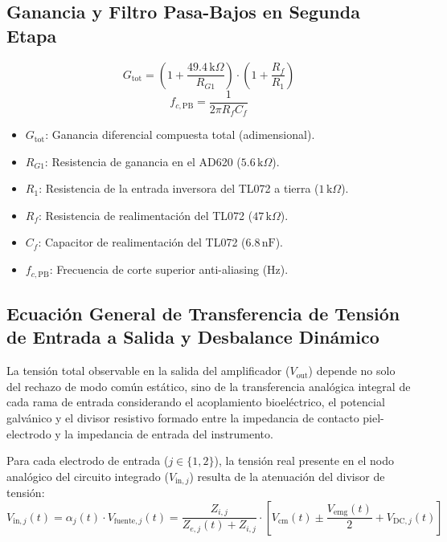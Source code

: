 \documentclass[11pt,a4paper]{article}
\begin{document}
\subsection{Ganancia y Filtro Pasa-Bajos en Segunda Etapa}
\begin{equation}
G_{\text{tot}} = \left( 1 + \frac{49.4\,\text{k}\Omega}{R_{G1}} \right) \cdot \left( 1 + \frac{R_f}{R_1} \right)
\end{equation}
\begin{equation}
f_{c, \text{PB}} = \frac{1}{2\pi R_f C_f}
\end{equation}
\begin{itemize}
    \item $G_{\text{tot}}$: Ganancia diferencial compuesta total (adimensional).
    \item $R_{G1}$: Resistencia de ganancia en el AD620 ($5.6\,\text{k}\Omega$).
    \item $R_1$: Resistencia de la entrada inversora del TL072 a tierra ($1\,\text{k}\Omega$).
    \item $R_f$: Resistencia de realimentación del TL072 ($47\,\text{k}\Omega$).
    \item $C_f$: Capacitor de realimentación del TL072 ($6.8\,\text{nF}$).
    \item $f_{c, \text{PB}}$: Frecuencia de corte superior anti-aliasing ($\text{Hz}$).
\end{itemize}

\subsection{Ecuación General de Transferencia de Tensión de Entrada a Salida y Desbalance Dinámico}
La tensión total observable en la salida del amplificador ($V_{\text{out}}$) depende no solo del rechazo de modo común estático, sino de la transferencia analógica integral de cada rama de entrada considerando el acoplamiento bioeléctrico, el potencial galvánico y el divisor resistivo formado entre la impedancia de contacto piel-electrodo y la impedancia de entrada del instrumento.

Para cada electrodo de entrada ($j \in \{1, 2\}$), la tensión real presente en el nodo analógico del circuito integrado ($V_{\text{in}, j}$) resulta de la atenuación del divisor de tensión:
\begin{equation}
V_{\text{in}, j}(t) = \alpha_j(t) \cdot V_{\text{fuente}, j}(t) = \frac{Z_{i, j}}{Z_{e, j}(t) + Z_{i, j}} \cdot \left[ V_{\text{cm}}(t) \pm \frac{V_{\text{emg}}(t)}{2} + V_{\text{DC}, j}(t) \right]
\end{equation}
\end{document}
